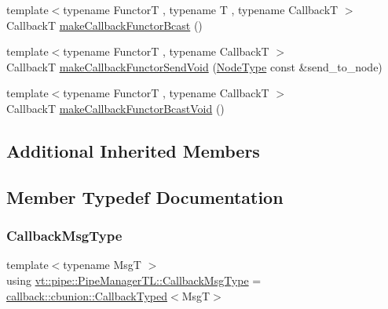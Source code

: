 \begin{DoxyCompactItemize}
\item 
{\footnotesize template$<$typename FunctorT , typename T , typename CallbackT $>$ }\\CallbackT \hyperlink{structvt_1_1pipe_1_1_pipe_manager_t_l_a023a1dde95875ecbbe53c7484e02caed}{make\+Callback\+Functor\+Bcast} ()
\item 
{\footnotesize template$<$typename FunctorT , typename CallbackT $>$ }\\CallbackT \hyperlink{structvt_1_1pipe_1_1_pipe_manager_t_l_a71bfb005f664ca5f0f6935afbcdb17de}{make\+Callback\+Functor\+Send\+Void} (\hyperlink{namespacevt_a866da9d0efc19c0a1ce79e9e492f47e2}{Node\+Type} const \&send\+\_\+to\+\_\+node)
\item 
{\footnotesize template$<$typename FunctorT , typename CallbackT $>$ }\\CallbackT \hyperlink{structvt_1_1pipe_1_1_pipe_manager_t_l_afc9683e41b08ba2647db78c292717593}{make\+Callback\+Functor\+Bcast\+Void} ()
\end{DoxyCompactItemize}
\subsection*{Additional Inherited Members}


\subsection{Member Typedef Documentation}
\mbox{\label{structvt_1_1pipe_1_1_pipe_manager_t_l_af6fc2c17f1729fa06450441b0ee81cb1}} 
\subsubsection{\texorpdfstring{Callback\+Msg\+Type}{CallbackMsgType}}
{\footnotesize\ttfamily template$<$typename MsgT $>$ \\
using \hyperlink{structvt_1_1pipe_1_1_pipe_manager_t_l_af6fc2c17f1729fa06450441b0ee81cb1}{vt\+::pipe\+::\+Pipe\+Manager\+T\+L\+::\+Callback\+Msg\+Type} =  \hyperlink{structvt_1_1pipe_1_1callback_1_1cbunion_1_1_callback_typed}{callback\+::cbunion\+::\+Callback\+Typed}$<$MsgT$>$}

\mbox{\label{structvt_1_1pipe_1_1_pipe_manager_t_l_a1cc1d0f1c80a36488f9b5d282e9755d2}} 
